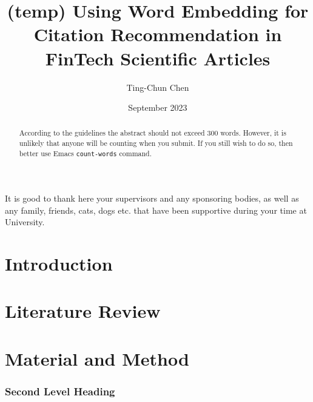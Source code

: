 \documentclass[11pt]{uonthesis}
\title{(temp) Using Word Embedding for Citation Recommendation 
in FinTech Scientific Articles}
\author{Ting-Chun Chen}
\date{September 2023}
\begin{document}
\begin{frontmatter}
\maketitle
\tableofcontents

\begin{abstract}
According to the guidelines the abstract should not exceed 300 words.
However, it is unlikely that anyone will be counting when you submit.
If you still wish to do so, then better use Emacs \verb|count-words|
command.
\end{abstract}

\begin{acknowledgements}
It is good to thank here your supervisors and any sponsoring bodies,
as well as any family, friends, cats, dogs etc. that have been
supportive during your time at University.
\end{acknowledgements}


\end{frontmatter}

\chapter{Introduction}


\chapter{Literature Review}


\chapter{Material and Method}




\subsection{Second Level Heading}
\end{document}
